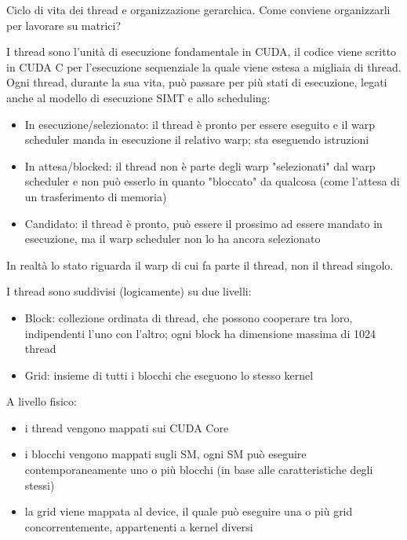 \begin{questions}
    \question Ciclo di vita dei thread e organizzazione gerarchica. Come conviene organizzarli per lavorare su matrici?
    
    \begin{solution}
    	I thread sono l'unità di esecuzione fondamentale in CUDA, il codice viene scritto in CUDA C per l'esecuzione sequenziale la quale viene estesa a migliaia di thread. Ogni thread, durante la sua vita, può passare per più stati di esecuzione, legati anche al modello di esecuzione SIMT e allo scheduling:
    	\begin{itemize}
    		\item In esecuzione/selezionato: il thread è pronto per essere eseguito e il warp scheduler manda in esecuzione il relativo warp; sta eseguendo istruzioni
    		
    		\item In attesa/blocked: il thread non è parte degli warp "selezionati" dal warp scheduler e non può esserlo in quanto "bloccato" da qualcosa (come l'attesa di un trasferimento di memoria)
    		
    		\item Candidato: il thread è pronto, può essere il prossimo ad essere mandato in esecuzione, ma il warp scheduler non lo ha ancora selezionato
    	\end{itemize}
    	In realtà lo stato riguarda il warp di cui fa parte il thread, non il thread singolo.
    	
    	I thread sono suddivisi (logicamente) su due livelli: 
    	\begin{itemize}
    		\item Block: collezione ordinata di thread, che possono cooperare tra loro, indipendenti l'uno con l'altro; ogni block ha dimensione massima di 1024 thread
    		
    		\item Grid: insieme di tutti i blocchi che eseguono lo stesso kernel
    	\end{itemize}
    	
    	A livello fisico: 
    	\begin{itemize}
    		\item i thread vengono mappati sui CUDA Core
    		
    		\item i blocchi vengono mappati sugli SM, ogni SM può eseguire contemporaneamente uno o più blocchi (in base alle caratteristiche degli stessi)
    		
    		\item la grid viene mappata al device, il quale può eseguire una o più grid concorrentemente, appartenenti a kernel diversi
    		

\end{itemize}
\end{solution}
\end{questions}
